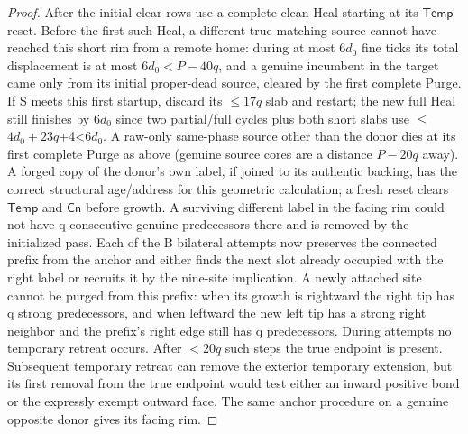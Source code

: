 \begin{proof}
After the initial clear rows use a complete clean Heal starting at its \(\mathsf{Temp}\) reset. Before the first such Heal, a different true matching source cannot have reached this short rim from a remote home: during at most \(6d_0\) fine ticks its total displacement is at most \(6d_0<P- 40q\), and a genuine incumbent in the target came only from its initial proper-dead source, cleared by the first complete Purge. If S meets this first startup, discard its \(\le\)\(17q\) slab and restart; the new full Heal still finishes by \(6d_0\) since two partial/full cycles plus both short slabs use \(\le\)\(4d_0+23q\)+4\textless{}\(6d_0\). A raw-only same-phase source other than the donor dies at its first complete Purge as above (genuine source cores are a distance \(P- 20q\) away). A forged copy of the donor's own label, if joined to its authentic backing, has the correct structural age/address for this geometric calculation; a fresh reset clears \(\mathsf{Temp}\) and \(\mathsf{Cn}\) before growth. A surviving different label in the facing rim could not have q consecutive genuine predecessors there and is removed by the initialized pass. Each of the B bilateral attempts now preserves the connected prefix from the anchor and either finds the next slot already occupied with the right label or recruits it by the nine-site implication. A newly attached site cannot be purged from this prefix: when its growth is rightward the right tip has q strong predecessors, and when leftward the new left tip has a strong right neighbor and the prefix's right edge still has q predecessors. During attempts no temporary retreat occurs. After \(<20q\) such steps the true endpoint is present. Subsequent temporary retreat can remove the exterior temporary extension, but its first removal from the true endpoint would test either an inward positive bond or the expressly exempt outward face. The same anchor procedure on a genuine opposite donor gives its facing rim.
\end{proof}

